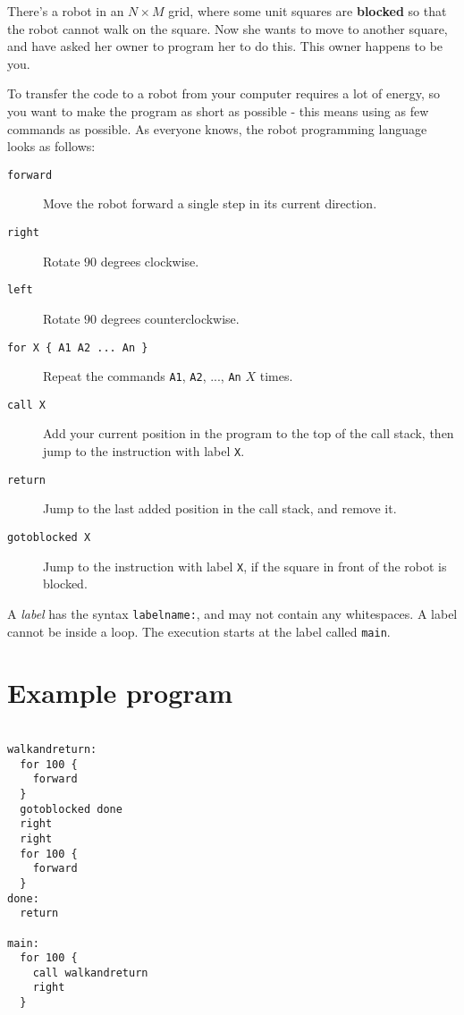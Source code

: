 
There's a robot in an $N \times M$ grid, where some unit squares are \textbf{blocked} so that the robot cannot walk on the square. Now she wants to move to another square, and have asked her owner to program her to do this.
This owner happens to be you.

To transfer the code to a robot from your computer requires a lot of energy, so you want to make the program as short as possible - this means using as few commands as possible.
As everyone knows, the robot programming language looks as follows:

\begin{description}
  \item[\texttt{forward}] Move the robot forward a single step in its current direction.
  \item[\texttt{right}] Rotate $90$ degrees clockwise.
  \item[\texttt{left}] Rotate $90$ degrees counterclockwise.
  \item[\texttt{for X \{ A1 A2 ... An \}}] Repeat the commands \texttt{A1}, \texttt{A2}, ..., \texttt{An} $X$ times.
  \item[\texttt{call X}] Add your current position in the program to the top of the call stack, then jump to the instruction with label \texttt{X}.
  \item[\texttt{return}] Jump to the last added position in the call stack, and remove it.
  \item[\texttt{gotoblocked X}] Jump to the instruction with label \texttt{X}, if the square in front of the robot is blocked.
\end{description}

A \emph{label} has the syntax \texttt{labelname:}, and may not contain any whitespaces. A label cannot be inside a loop. The execution starts at the label called \texttt{main}.

\section*{Example program}

\begin{verbatim}

walkandreturn:
  for 100 {
    forward
  }
  gotoblocked done
  right
  right
  for 100 {
    forward
  }
done:
  return

main:
  for 100 {
    call walkandreturn
    right
  }
\end{verbatim}


